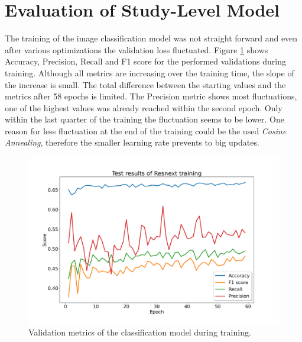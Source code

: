 \section{Evaluation of Study-Level Model}
The training of the image classification model was not straight forward and even after various optimizations the validation loss fluctuated. Figure \ref{fig:study-validation-metrics} shows Accuracy, Precision, Recall and F1 score for the performed validations during training. Although all metrics are increasing over the training time, the slope of the increase is small. The total difference between the starting values and the metrics after 58 epochs is limited. The Precision metric shows most fluctuations, one of the highest values was already reached within the second epoch. Only within the last quarter of the training the fluctuation seems to be lower. One reason for less fluctuation at the end of the training could be the used \textit{Cosine Annealing}, therefore the smaller learning rate prevents to big updates.
\begin{figure}
	\centering
	\includegraphics[width=.7\linewidth]{img/test_metrics_study_58.png}
	\caption{Validation metrics of the classification model during training.}
	\label{fig:study-validation-metrics}
\end{figure}

